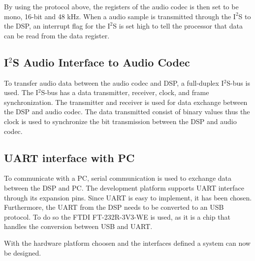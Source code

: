 By using the protocol above, the registers of the audio codec is then set to be mono, 16-bit and 48 kHz. When a audio sample is transmitted through the $\text{I}^2$S to the DSP, an interrupt flag for the $\text{I}^2$S is set high to tell the processor that data can be read from the data register. 

\subsection*{I$^2$S Audio Interface to Audio Codec}

To transfer audio data between the audio codec and DSP, a full-duplex I$^2$S-bus is used. The I$^2$S-bus has a data transmitter, receiver, clock, and frame synchronization. The transmitter and receiver is used for data exchange between the DSP and audio codec. The data transmitted consist of binary values thus the clock is used to synchronize the bit transmission between the DSP and audio codec.

\subsection*{UART interface with PC}

To communicate with a PC, serial communication is used to exchange data between the DSP and PC. The development platform supports UART interface through its expansion pins. Since UART is easy to implement, it has been chosen. Furthermore, the UART from the DSP needs to be converted to an USB protocol. To do so the FTDI FT-232R-3V3-WE is used, as it is a chip that handles the conversion between USB and UART.

With the hardware platform choosen and the interfaces defined a system can now be designed.









